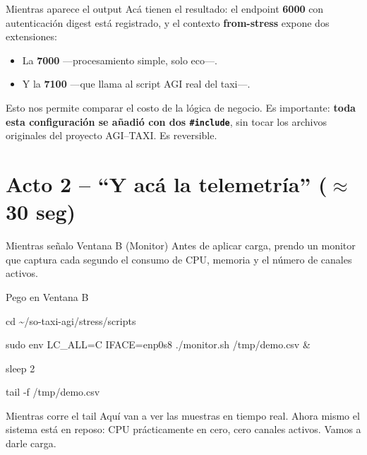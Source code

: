 \documentclass[11pt,letterpaper]{article}
\begin{document}
\begin{habla}{Mientras aparece el output}
Acá tienen el resultado: el endpoint \textbf{6000} con autenticaci\'on digest est\'a registrado, y el contexto \textbf{from-stress} expone dos extensiones:

\begin{itemize}[leftmargin=1.5em, itemsep=0.2em]
  \item La \textbf{7000} ---procesamiento simple, solo eco---.
  \item Y la \textbf{7100} ---que llama al script AGI real del taxi---.
\end{itemize}

Esto nos permite comparar el costo de la l\'ogica de negocio. Es importante: \textbf{toda esta configuraci\'on se a\~nadi\'o con dos \texttt{\#include}}, sin tocar los archivos originales del proyecto AGI--TAXI. Es reversible.
\end{habla}

\section*{Acto 2 -- ``Y acá la telemetría'' ($\approx$ 30 seg)}

\begin{habla}{Mientras se\~nalo Ventana B (Monitor)}
Antes de aplicar carga, prendo un monitor que captura cada segundo el consumo de CPU, memoria y el n\'umero de canales activos.
\end{habla}

\begin{accion}{Pego en Ventana B}
\begin{comando}
cd \textasciitilde/so-taxi-agi/stress/scripts

sudo env LC\_ALL=C IFACE=enp0s8 ./monitor.sh /tmp/demo.csv \&

sleep 2

tail -f /tmp/demo.csv
\end{comando}
\end{accion}

\begin{habla}{Mientras corre el tail}
Aqu\'i van a ver las muestras en tiempo real. Ahora mismo el sistema est\'a en reposo: CPU pr\'acticamente en cero, cero canales activos. Vamos a darle carga.
\end{habla}

\end{document}
